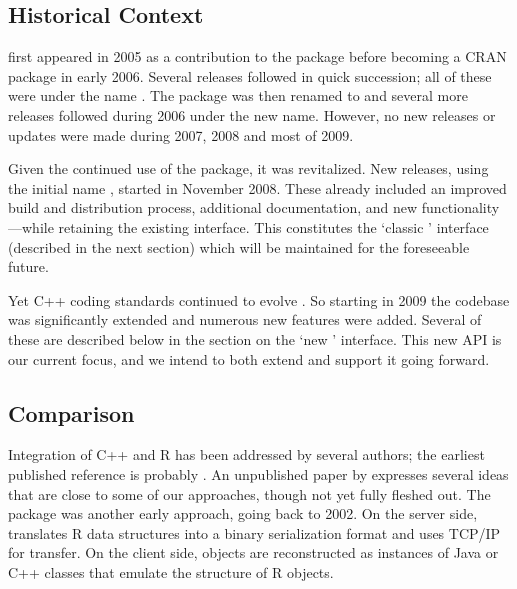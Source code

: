 \subsection{Historical Context}

 first appeared in 2005 as a contribution to the 
package \citep{eddelbuettelkhan09:rquantlib} before becoming a CRAN
package in early 2006. Several releases followed in quick succession; all of
these were under the name . The package was then renamed to
 and several more releases followed during 2006 under the
new name.  However, no new releases or updates were made during 2007, 2008
and most of 2009.

Given the continued use of the package, it was revitalized. New
releases, using the initial name , started in November 2008. These
already included an improved build and distribution process, additional
documentation, and new functionality---while retaining the existing
interface.  This constitutes the `classic ' interface (described in
the next section) which will be maintained for the foreseeable future.

Yet C++ coding standards continued to evolve \citep{meyers:effectivecplusplus}.
So starting in 2009 the codebase was significantly extended and numerous new
features were added.  Several of these are described below in the section on
the `new ' interface. This new API is our current focus, and we
intend to both extend and support it going forward.

\subsection{Comparison}

Integration of C++ and R has been addressed by several authors; the earliest
published reference is probably \cite{batesdebroy01:cppclasses}.
An unpublished paper by \cite{javagailemanly07:r_cpp} expresses several ideas
that are close to some of our approaches, though not yet fully fleshed out.
%
The  package \citep{cran:Rserve} was another early approach,
going back to 2002. On the server side,  translates R data
structures into a binary serialization format and uses TCP/IP for
transfer. On the client side, objects are reconstructed as instances of Java
or C++ classes that emulate the structure of R objects. 

